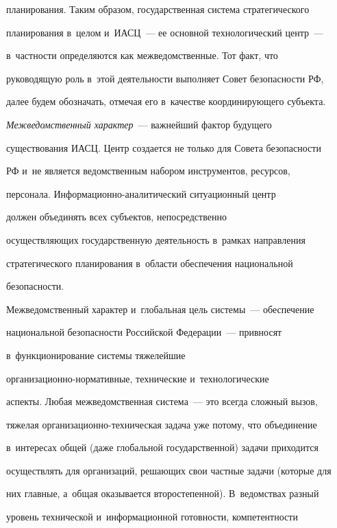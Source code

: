 планирования. Таким образом, государственная система стратегического 


планирования в~целом и~ИАСЦ~--- ее основной технологический центр~--- 


в~частности определяются как межведомственные. Тот факт, что 


руководящую роль в~этой деятельности выполняет Совет безопасности РФ, 


далее будем обозначать, отмечая его в~качестве координирующего субъекта.


     


     \textit{Межведомственный характер}~--- важнейший фактор будущего 


существования ИАСЦ. Центр создается не только для Совета без\-опас\-ности 


РФ и~не является ведомственным набором инструментов, ресурсов, 


персонала. Ин\-фор\-ма\-ци\-он\-но-ана\-ли\-ти\-че\-ский ситуационный центр


 должен объединять всех субъектов, непосредственно 


осуществляющих государственную деятельность в~рамках направления 


стратегического планирования в~области обеспечения национальной  


безопас\-ности.


     


     Межведомственный характер и~глобальная цель системы~--- обеспечение 


национальной безопасности Российской Федерации~--- привносят 


в~функционирование системы тяжелейшие  


ор\-га\-ни\-за\-ци\-он\-но-нор\-ма\-тив\-ные, технические и~технологические 


аспекты. Любая межведомственная система~--- это всегда сложный вызов, 


тяжелая организационно-техническая задача уже потому, что объединение 


в~интересах общей (даже глобальной государственной) задачи приходится 


осуществлять для организаций, решающих свои частные задачи (которые для 


них главные, а~общая оказывается второстепенной). В~ведомствах разный 


уровень технической и~информационной готовности, компетентности 


